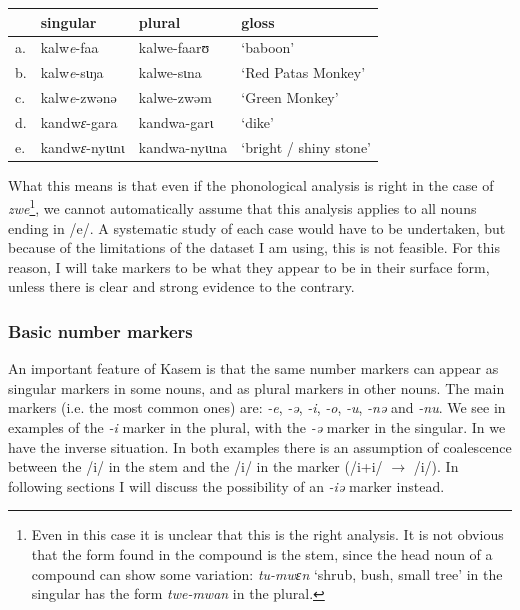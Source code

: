 \begin{exe}
    \ex \label{stem-E-compounds}
    \begin{tabular}[t]{llll}
      & singular      & plural        & gloss                                          \\
      \midrule
      a. & kalw\textit{e}-faa     & kalwe-faarʊ   & `baboon'                                       \\
      b. & kalw\textit{e}-sɩŋa    & kalwe-sɩna    & `Red Patas Monkey'                             \\
      c. & kalw\textit{e}-zwənə   & kalwe-zwəm    & `Green Monkey'                                 \\
      d. & kandw\textit{ɛ}-gara   & kandwa-garɩ   & `dike' \\
      e. & kandw\textit{ɛ}-nyɩɩnɩ & kandwa-nyɩɩna & `bright / shiny stone'                         \\
    \end{tabular}
\end{exe}

What this means is that even if the phonological analysis is right in the case of \textit{zwe}\footnote{Even in this case it is unclear that this is the right analysis. It is not obvious that the form found in the compound is the stem, since the head noun of a compound can show some variation: \textit{tu-mwɛn} `shrub, bush, small tree' in the singular has the form \textit{t\emph{we}-mwan} in the plural.}, we cannot automatically assume that this analysis applies to all nouns ending in /e/. A systematic study of each case would have to be undertaken, but because of the limitations of the dataset I am using, this is not feasible. For this reason, I will take markers to be what they appear to be in their surface form, unless there is clear and strong evidence to the contrary.

\subsubsection{Basic number markers}

An important feature of Kasem is that the same number markers can appear as singular markers in some nouns, and as plural markers in other nouns. The main markers (i.e. the most common ones) are: \textit{-e}, \textit{-ə}, \textit{-i}, \textit{-o}, \textit{-u},  \textit{-nə} and \textit{-nu}. We see in  examples of the \textit{-i} marker in the plural, with the \textit{-ə} marker in the singular. In  we have the inverse situation. In both examples there is an assumption of coalescence between the /i/ in the stem and the /i/ in the marker (/i+i/ $\rightarrow$ /i/). In following sections I will discuss the possibility of an \textit{-iə} marker instead.

